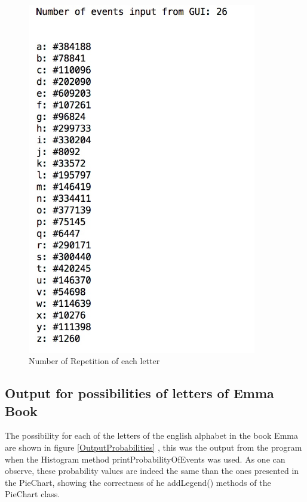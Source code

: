 \documentclass[a4paper,12pt]{article}
\begin{document}
\begin{figure}[H]
   \centering
   \includegraphics[width = 10cm]{outputFrequencies} %
   \caption{Number of Repetition of each letter}
   \label{Number of Repetition of each letter}
\end{figure}

\subsection{Output for possibilities of letters  of Emma Book}

The possibility for each of the letters of the english alphabet in the book Emma are shown in figure \ref{OutputProbabilities} , this was the output from the program when the Histogram method printProbabilityOfEvents was used. As one can observe, these probability values are indeed the same than the ones presented in the PieChart, showing the correctness of he addLegend() methods of the PieChart class. 
\end{document}
